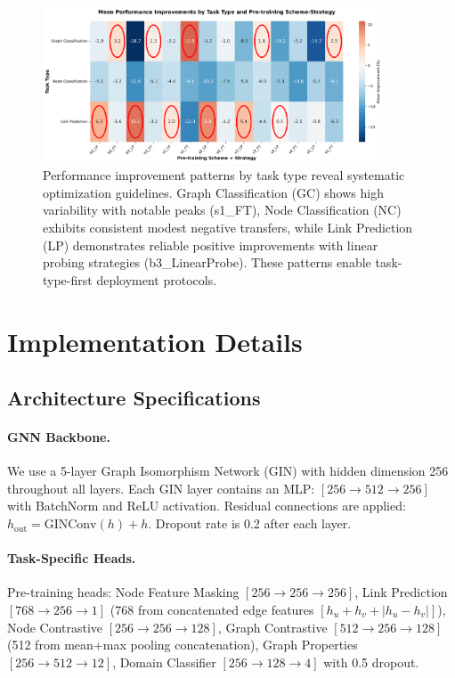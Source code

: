 \documentclass[11pt]{article}
\begin{document}
\begin{figure}[!h]
\centering
\includegraphics[width=0.9\textwidth]{task_type_performance_heatmap.png}
\caption{Performance improvement patterns by task type reveal systematic optimization guidelines. Graph Classification (GC) shows high variability with notable peaks (s1\_FT), Node Classification (NC) exhibits consistent modest negative transfers, while Link Prediction (LP) demonstrates reliable positive improvements with linear probing strategies (b3\_LinearProbe). These patterns enable task-type-first deployment protocols.}
\label{fig:task-heatmap}
\end{figure}

\clearpage

\appendix

\section{Implementation Details}

\subsection{Architecture Specifications}

\paragraph{GNN Backbone.} We use a 5-layer Graph Isomorphism Network (GIN) with hidden dimension 256 throughout all layers. Each GIN layer contains an MLP: $[256 \rightarrow 512 \rightarrow 256]$ with BatchNorm and ReLU activation. Residual connections are applied: $h_{\text{out}} = \text{GINConv}(h) + h$. Dropout rate is 0.2 after each layer.

\paragraph{Task-Specific Heads.} Pre-training heads: Node Feature Masking $[256 \rightarrow 256 \rightarrow 256]$, Link Prediction $[768 \rightarrow 256 \rightarrow 1]$ (768 from concatenated edge features $[h_u + h_v + |h_u - h_v|]$), Node Contrastive $[256 \rightarrow 256 \rightarrow 128]$, Graph Contrastive $[512 \rightarrow 256 \rightarrow 128]$ (512 from mean+max pooling concatenation), Graph Properties $[256 \rightarrow 512 \rightarrow 12]$, Domain Classifier $[256 \rightarrow 128 \rightarrow 4]$ with 0.5 dropout.
\end{document}
